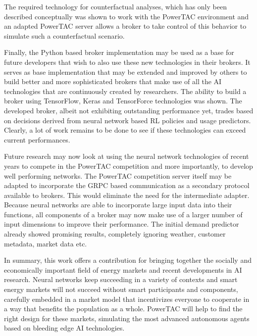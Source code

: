 The required technology for counterfactual analyses, which has only been described conceptually was shown to work with
the \ac{PowerTAC} environment and an adapted \ac{PowerTAC} server allows a broker to take control of this behavior to
simulate such a counterfactual scenario.

Finally, the Python based broker implementation may be used as a base for future developers that wish to also use these
new technologies in their brokers. It serves as base implementation that may be extended and improved by others to build
better and more sophisticated brokers that make use of all the \ac{AI} technologies that are continuously created by
researchers. The ability to build a broker using TensorFlow, Keras and TensorForce technologies was shown. The
developed broker, albeit not exhibiting outstanding performance yet, trades based on decisions derived from neural network based \ac{RL}
policies and usage predictors. Clearly, a lot of work remains to be done to see if these technologies can exceed current
performances.


Future research may now look at using the neural network technologies of recent years to compete in the \ac{PowerTAC}
competition and more importantly, to develop well performing networks. The \ac{PowerTAC} competition server itself may
be adapted to incorporate the \ac{GRPC} based communication as a secondary protocol available to brokers. This would
eliminate the need for the intermediate adapter. Because neural networks are able to incorporate large input data into
their functions, all components of a broker may now make use of a larger number of input dimensions to improve their
performance. The initial demand predictor already showed promising results, completely ignoring weather, customer
metadata, market data etc.

In summary, this work offers a contribution for bringing together the socially and economically important field of
energy markets and recent developments in \ac{AI} research. Neural networks keep succeeding in a variety of
contexts and smart energy markets will not succeed without smart participants and components, carefully embedded in a
market model that incentivizes everyone to cooperate in a way that benefits the population as a whole. \ac{PowerTAC}
will help to find the right design for these markets, simulating the most advanced autonomous agents based on bleeding
edge \ac{AI} technologies.
